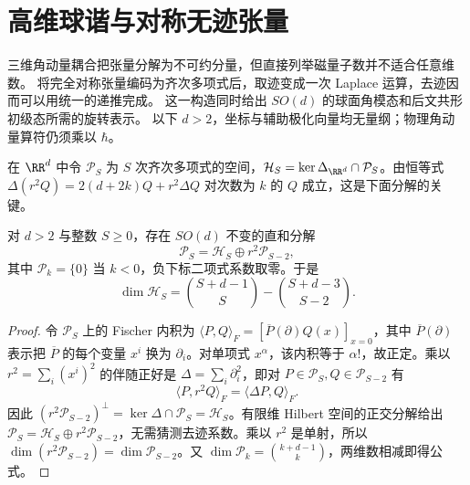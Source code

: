 \section{高维球谐与对称无迹张量}
\label{sec:ghs-harmonics-stf}

三维角动量耦合把张量分解为不可约分量，但直接列举磁量子数并不适合任意维数。
将完全对称张量编码为齐次多项式后，取迹变成一次 Laplace 运算，去迹因而可以用统一的递推完成。
这一构造同时给出 $SO(d)$ 的球面角模态和后文共形初级态所需的旋转表示。
以下 $d>2$，坐标与辅助极化向量均无量纲；物理角动量算符仍须乘以 $\hbar$。

\begin{definition}[齐次多项式与调和张量]
在 $\RR^d$ 中令 $\mathcal P_S$ 为 $S$ 次齐次多项式的空间，$\mathcal H_S=\ker\Delta_{\RR^d}\cap\mathcal P_S$。由恒等式 $\Delta(r^2Q)=2(d+2k)Q+r^2\Delta Q$ 对次数为 $k$ 的 $Q$ 成立，这是下面分解的关键。
\end{definition}

\begin{theorem}[调和分解与球谐维数]
\label{thm:ghs-harmonic-polynomial-decomposition}
对 $d>2$ 与整数 $S\geq 0$，存在 $SO(d)$ 不变的直和分解
\begin{equation}\label{eq:ghs-harmonic-direct-sum}
 \mathcal P_S=\mathcal H_S\oplus r^2\mathcal P_{S-2},
\end{equation}
其中 $\mathcal P_{k}=\{0\}$ 当 $k<0$，负下标二项式系数取零。于是
\begin{equation}\label{eq:ghs-dim-harmonic-polynomial}
 \dim\mathcal H_S=\binom{S+d-1}{S}-\binom{S+d-3}{S-2}.
\end{equation}
\end{theorem}
\begin{proof}
令 $\mathcal P_S$ 上的 Fischer 内积为
$\langle P,Q\rangle_F=[\overline{P}(\partial)Q(x)]_{x=0}$，其中
$\overline{P}(\partial)$ 表示把 $\overline P$ 的每个变量 $x^i$ 换为 $\partial_i$。对单项式 $x^\alpha$，该内积等于 $\alpha!$，故正定。乘以 $r^2=\sum_i(x^i)^2$ 的伴随正好是 $\Delta=\sum_i\partial_i^2$，即对 $P\in\mathcal P_S,Q\in\mathcal P_{S-2}$ 有
\[
 \langle P,r^2Q\rangle_F=\langle\Delta P,Q\rangle_F.
\]
因此 $(r^2\mathcal P_{S-2})^\perp=\ker\Delta\cap\mathcal P_S=\mathcal H_S$。有限维 Hilbert 空间的正交分解给出
$\mathcal P_S=\mathcal H_S\oplus r^2\mathcal P_{S-2}$，无需猜测去迹系数。乘以 $r^2$ 是单射，所以
$\dim(r^2\mathcal P_{S-2})=\dim\mathcal P_{S-2}$。又 $\dim\mathcal P_k=\binom{k+d-1}{k}$，两维数相减即得公式。
\end{proof}

